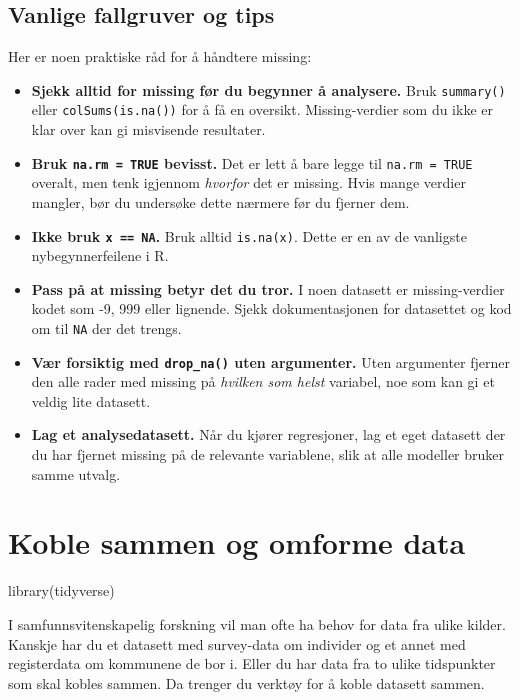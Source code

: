 \documentclass[
  norsk,
  letterpaper,
  DIV=11,
  numbers=noendperiod]{scrreprt}
\newenvironment{Shaded}{\begin{snugshade}}{\end{snugshade}}
\newcommand{\FunctionTok}[1]{\textcolor[rgb]{0.28,0.35,0.67}{#1}}
\newcommand{\NormalTok}[1]{\textcolor[rgb]{0.00,0.23,0.31}{#1}}
\providecommand{\tightlist}{%
  \setlength{\itemsep}{0pt}\setlength{\parskip}{0pt}}
\theoremstyle{definition}
\theoremstyle{remark}
\begin{document}
\section{Vanlige fallgruver og tips}\label{vanlige-fallgruver-og-tips}

Her er noen praktiske råd for å håndtere missing:

\begin{itemize}
\tightlist
\item
  \textbf{Sjekk alltid for missing før du begynner å analysere.} Bruk
  \texttt{summary()} eller \texttt{colSums(is.na())} for å få en
  oversikt. Missing-verdier som du ikke er klar over kan gi misvisende
  resultater.
\item
  \textbf{Bruk \texttt{na.rm\ =\ TRUE} bevisst.} Det er lett å bare
  legge til \texttt{na.rm\ =\ TRUE} overalt, men tenk igjennom
  \emph{hvorfor} det er missing. Hvis mange verdier mangler, bør du
  undersøke dette nærmere før du fjerner dem.
\item
  \textbf{Ikke bruk \texttt{x\ ==\ NA}.} Bruk alltid \texttt{is.na(x)}.
  Dette er en av de vanligste nybegynnerfeilene i R.
\item
  \textbf{Pass på at missing betyr det du tror.} I noen datasett er
  missing-verdier kodet som -9, 999 eller lignende. Sjekk
  dokumentasjonen for datasettet og kod om til \texttt{NA} der det
  trengs.
\item
  \textbf{Vær forsiktig med \texttt{drop\_na()} uten argumenter.} Uten
  argumenter fjerner den alle rader med missing på \emph{hvilken som
  helst} variabel, noe som kan gi et veldig lite datasett.
\item
  \textbf{Lag et analysedatasett.} Når du kjører regresjoner, lag et
  eget datasett der du har fjernet missing på de relevante variablene,
  slik at alle modeller bruker samme utvalg.
\end{itemize}

\chapter{Koble sammen og omforme
data}\label{koble-sammen-og-omforme-data}

\begin{Shaded}
\begin{Highlighting}[]
\FunctionTok{library}\NormalTok{(tidyverse)}
\end{Highlighting}
\end{Shaded}

I samfunnsvitenskapelig forskning vil man ofte ha behov for data fra
ulike kilder. Kanskje har du et datasett med survey-data om individer og
et annet med registerdata om kommunene de bor i. Eller du har data fra
to ulike tidspunkter som skal kobles sammen. Da trenger du verktøy for å
koble datasett sammen.
\end{document}
